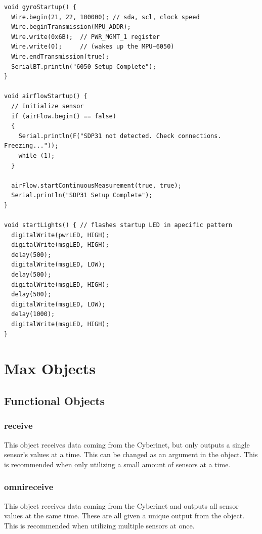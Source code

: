 \begin{verbatim}
void gyroStartup() {
  Wire.begin(21, 22, 100000); // sda, scl, clock speed
  Wire.beginTransmission(MPU_ADDR);
  Wire.write(0x6B);  // PWR_MGMT_1 register
  Wire.write(0);     // (wakes up the MPU−6050)
  Wire.endTransmission(true);
  SerialBT.println("6050 Setup Complete");
}

void airflowStartup() {
  // Initialize sensor
  if (airFlow.begin() == false)
  {
    Serial.println(F("SDP31 not detected. Check connections. Freezing..."));
    while (1);
  }

  airFlow.startContinuousMeasurement(true, true);
  Serial.println("SDP31 Setup Complete");
}

void startLights() { // flashes startup LED in apecific pattern
  digitalWrite(pwrLED, HIGH);
  digitalWrite(msgLED, HIGH);
  delay(500);
  digitalWrite(msgLED, LOW);
  delay(500);
  digitalWrite(msgLED, HIGH);
  delay(500);
  digitalWrite(msgLED, LOW);
  delay(1000);
  digitalWrite(msgLED, HIGH);
}

\end{verbatim}

\section{Max Objects}

\subsection{Functional Objects}

\subsubsection{receive~}
\vspace{5mm}

This object receives data coming from the Cyberinet, but only outputs a single sensor's values at a time. This can be changed as an argument in the object. This is recommended when only utilizing a small amount of sensors at a time.

\subsubsection{omnireceive~}
\vspace{5mm}
This object receives data coming from the Cyberinet and outputs all sensor values at the same time. These are all given a unique output from the object. This is recommended when utilizing multiple sensors at once.

